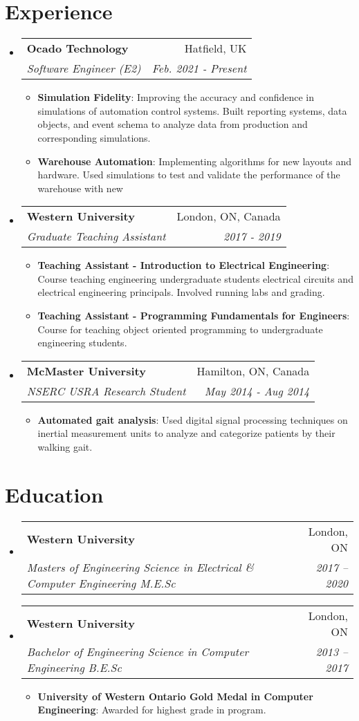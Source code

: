 \documentclass[letterpaper,11pt]{article}
\makeatletter
\newcommand{\resumeItem}[2]{
  \item\small{
    \textbf{#1}{: #2 \vspace{-2pt}}
  }
}
\newcommand{\resumeSubheading}[4]{
  \vspace{-1pt}\item
    \begin{tabular*}{0.97\textwidth}[t]{l@{\extracolsep{\fill}}r}
      \textbf{#1} & #2 \\
      \textit{\small#3} & \textit{\small #4} \\
    \end{tabular*}\vspace{-5pt}
}
\newcommand{\resumeSubHeadingListStart}{\begin{itemize}[leftmargin=*]}
\newcommand{\resumeSubHeadingListEnd}{\end{itemize}}
\newcommand{\resumeItemListStart}{\begin{itemize}}
\newcommand{\resumeItemListEnd}{\end{itemize}\vspace{-5pt}}
\makeatother
\begin{document}
\section{Experience}
	\resumeSubHeadingListStart
		\resumeSubheading
		{Ocado Technology}{Hatfield, UK}
		{Software Engineer (E2)}{Feb. 2021 - Present}
		\resumeItemListStart
		\resumeItem{Simulation Fidelity}{Improving the accuracy and confidence in simulations of automation control systems. Built reporting systems, data objects, and event schema to analyze data from production and corresponding simulations.}
		\resumeItem{Warehouse Automation}{Implementing algorithms for new layouts and hardware. Used simulations to test and validate the performance of the warehouse with new }
		\resumeItemListEnd
    	\resumeSubheading
      	{Western University}{London, ON, Canada}
      	{Graduate Teaching Assistant}{2017 - 2019}
      	\resumeItemListStart
      	\resumeItem{Teaching Assistant - Introduction to Electrical Engineering}
      	{Course teaching engineering undergraduate students electrical circuits and electrical engineering principals. Involved running labs and grading.}
        \resumeItem{Teaching Assistant - Programming Fundamentals for Engineers}
        {Course for teaching object oriented programming to undergraduate engineering students. }
      	\resumeItemListEnd
      	\resumeSubheading
      	{McMaster University}{Hamilton, ON, Canada}
      	{NSERC USRA Research Student}{May 2014 - Aug 2014}
      	\resumeItemListStart
      	\resumeItem{Automated gait analysis}
      	{Used digital signal processing techniques on inertial measurement units to analyze and categorize patients by their walking gait.}
      	\resumeItemListEnd	

  \resumeSubHeadingListEnd

\section{Education}
	\resumeSubHeadingListStart
		\resumeSubheading
			{Western University}{London, ON}
			{Masters of Engineering Science in Electrical \& Computer Engineering M.E.Sc}{ 2017 -- 2020}
    	\resumeSubheading
      		{Western University}{London, ON}
      		{Bachelor of Engineering Science in Computer Engineering B.E.Sc}{2013 -- 2017}
      		\resumeItemListStart
      		\resumeItem{University of Western Ontario Gold Medal in Computer Engineering}{Awarded for highest grade in program.}
      		\resumeItemListEnd
  	\resumeSubHeadingListEnd
\end{document}
